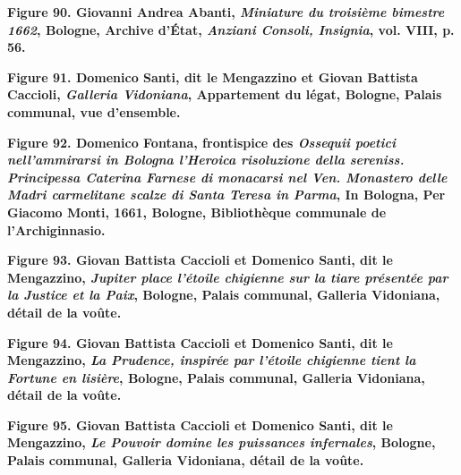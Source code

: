 \documentclass[12pt,twoside,openany]{book}
\begin{document}
\begin{center}
\par\small \textbf{Figure 90. Giovanni Andrea Abanti, \textit{Miniature du troisième bimestre 1662}, Bologne, Archive d’État, \textit{Anziani Consoli, Insignia}, vol. VIII, p. 56.}
\end{center}

\begin{center}
\par\small \textbf{Figure 91. Domenico Santi, dit le Mengazzino et Giovan Battista Caccioli, \textit{Galleria Vidoniana}, Appartement du légat, Bologne, Palais communal, vue d’ensemble.}
\end{center}

\begin{center}
\par\small \textbf{Figure 92. Domenico Fontana, frontispice des \textit{Ossequii poetici nell’ammirarsi in Bologna l’Heroica risoluzione della sereniss. Principessa Caterina Farnese di monacarsi nel Ven. Monastero delle Madri carmelitane scalze di Santa Teresa in Parma}, In Bologna, Per Giacomo Monti, 1661, Bologne, Bibliothèque communale de l’Archiginnasio.}
\end{center}

\begin{center}
\par\small \textbf{Figure 93. Giovan Battista Caccioli et Domenico Santi, dit le Mengazzino, \textit{Jupiter place l’étoile chigienne sur la tiare présentée par la Justice et la Paix}, Bologne, Palais communal, Galleria Vidoniana, détail de la voûte.}
\end{center}

\begin{center}
\par\small \textbf{Figure 94. Giovan Battista Caccioli et Domenico Santi, dit le Mengazzino, \textit{La Prudence, inspirée par l’étoile chigienne tient la Fortune en lisière}, Bologne, Palais communal, Galleria Vidoniana, détail de la voûte.}
\end{center}

\begin{center}
\par\small \textbf{Figure 95. Giovan Battista Caccioli et Domenico Santi, dit le Mengazzino, \textit{Le Pouvoir domine les puissances infernales}, Bologne, Palais communal, Galleria Vidoniana, détail de la voûte.}
\end{center}
\end{document}
